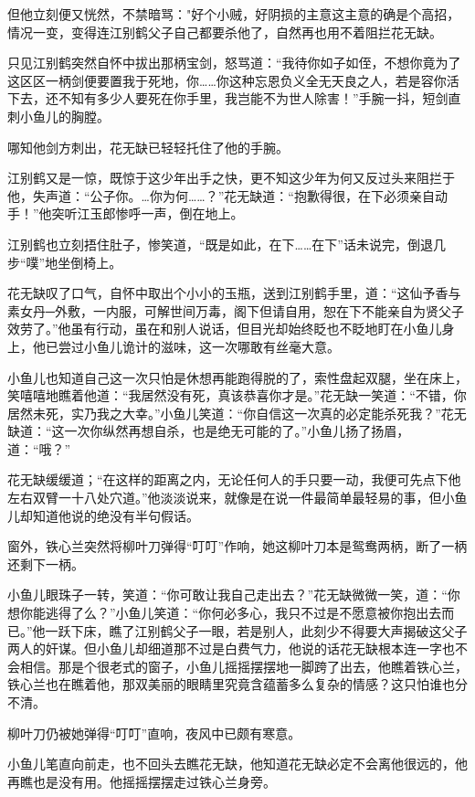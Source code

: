 \documentclass[12pt,oneside]{book}
\begin{document}
但他立刻便又恍然，不禁暗骂："好个小贼，好阴损的主意这主意的确是个高招，情况一变，变得连江别鹤父子自己都要杀他了，自然再也用不着阻拦花无缺。

只见江别鹤突然自怀中拔出那柄宝剑，怒骂道：``我待你如子如侄，不想你竟为了这区区一柄剑便要置我于死地，你\ldots\ldots 你这种忘恩负义全无天良之人，若是容你活下去，还不知有多少人要死在你手里，我岂能不为世人除害！''手腕一抖，短剑直刺小鱼儿的胸膛。

哪知他剑方刺出，花无缺已轻轻托住了他的手腕。

江别鹤又是一惊，既惊于这少年出手之快，更不知这少年为何又反过头来阻拦于他，失声道：``公子你。\ldots 你为何\ldots\ldots？''花无缺道：``抱歉得很，在下必须亲自动手！''他突听江玉郎惨呼一声，倒在地上。

江别鹤也立刻捂住肚子，惨笑道，``既是如此，在下\ldots\ldots 在下''话未说完，倒退几步``噗''地坐倒椅上。

花无缺叹了口气，自怀中取出个小小的玉瓶，送到江别鹤手里，道：``这仙予香与素女丹─外敷，一内服，可解世间万毒，阁下但请自用，恕在下不能亲自为贤父子效劳了。''他虽有行动，虽在和别人说话，但目光却始终眨也不眨地盯在小鱼儿身上，他已尝过小鱼儿诡计的滋味，这一次哪敢有丝毫大意。

小鱼儿也知道自己这一次只怕是休想再能跑得脱的了，索性盘起双腿，坐在床上，笑嘻嘻地瞧着他道：``我居然没有死，真该恭喜你才是。''花无缺一笑道：``不错，你居然未死，实乃我之大幸。''小鱼儿笑道：``你自信这一次真的必定能杀死我？''花无缺道：``这一次你纵然再想自杀，也是绝无可能的了。''小鱼儿扬了扬眉，道：``哦？''

花无缺缓缓道；``在这样的距离之内，无论任何人的手只要一动，我便可先点下他左右双臂一十八处穴道。''他淡淡说来，就像是在说一件最简单最轻易的事，但小鱼儿却知道他说的绝没有半句假话。

窗外，铁心兰突然将柳叶刀弹得``叮叮''作响，她这柳叶刀本是鸳鸯两柄，断了一柄还剩下一柄。

小鱼儿眼珠子一转，笑道：``你可敢让我自己走出去？''花无缺微微一笑，道：``你想你能逃得了么？''小鱼儿笑道：``你何必多心，我只不过是不愿意被你抱出去而已。''他一跃下床，瞧了江别鹤父子一眼，若是别人，此刻少不得要大声揭破这父子两人的奸谋。但小鱼儿却细道那不过是白费气力，他说的话花无缺根本连一字也不会相信。那是个很老式的窗子，小鱼儿摇摇摆摆地一脚跨了出去，他瞧着铁心兰，铁心兰也在瞧着他，那双美丽的眼睛里究竟含蕴蓄多么复杂的情感？这只怕谁也分不清。

柳叶刀仍被她弹得``叮叮''直响，夜风中已颇有寒意。

小鱼儿笔直向前走，也不回头去瞧花无缺，他知道花无缺必定不会离他很远的，他再瞧也是没有用。他摇摇摆摆走过铁心兰身旁。
\end{document}
